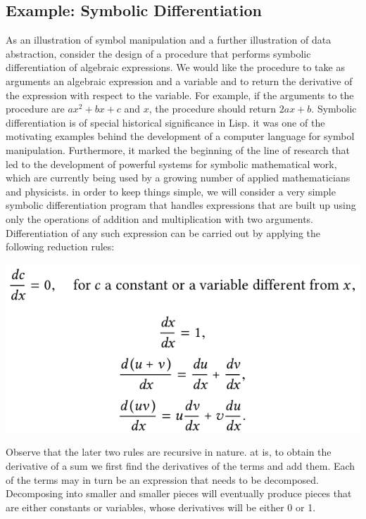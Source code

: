 \documentclass[a4paper,twoside]{article}
\numberwithin{equation}{section}
\begin{document}
\subsection{Example: Symbolic Differentiation}
As an illustration of symbol manipulation and a further illustration of
data abstraction, consider the design of a procedure that performs symbolic differentiation of algebraic expressions. We would like the procedure to take as arguments an algebraic expression and a variable and to return the derivative of the expression with respect to the variable. For example, if the arguments to the procedure are $ax^2 + bx + c$ and $x$, the procedure should return $2ax + b$. Symbolic differentiation is of special historical significance in Lisp. it was one of the motivating examples behind the development of a computer language for symbol manipulation. Furthermore, it marked the beginning of the line of research that led to the development of powerful systems for symbolic mathematical work, which are currently being used by a growing number of applied mathematicians and physicists. \newline
in order to keep things simple, we will consider a very simple symbolic differentiation program that handles expressions that are built up using only the operations of addition and multiplication with two arguments. Differentiation of any such expression can be carried out by applying the following reduction rules:
\begin{center}
    \includegraphics[scale = 0.3]{assets/derivative.png}
\end{center}
Observe that the later two rules are recursive in nature. at is, to obtain the derivative of a sum we first find the derivatives of the terms and add them. Each of the terms may in turn be an expression that needs to be decomposed. Decomposing into smaller and smaller pieces will eventually produce pieces that are either constants or variables, whose derivatives will be either 0 or 1.
\end{document}
